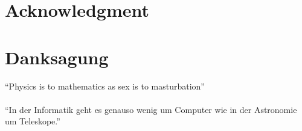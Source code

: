 % 

%
{%
	\chapter*{Acknowledgment}%
}{%
	\chapter*{Danksagung}%
}
\thispagestyle{\indexpagestyle}
	\RaggedRight
	\enquote{Physics is to mathematics as sex is to masturbation}\\
	\\
	\vspace{2em}
	\RaggedRight
	\enquote{In der Informatik geht es genauso wenig um Computer wie in der Astronomie um Teleskope.}\\
